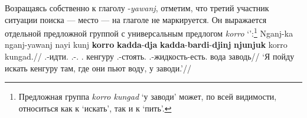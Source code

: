 
Возращаясь собственно к глаголу -\textit{yawanj}, отметим, что третий участник ситуации поиска --- место --- на глаголе не маркируется. Он выражается отдельной предложной группой с универсальным предлогом \textit{korro} `\korro':\footnote{Предложная группа \textit{korro kungad} `у заводи' может, по всей видимости, относиться как к `искать', так и к `пить'.}
\begingl
\gla Nganj-ka nganj-yawanj nayi kunj \textbf{korro} \textbf{kadda}-\textbf{dja} \textbf{kadda}-\textbf{bardi}-\textbf{djinj} \textbf{njunjuk} korro kungad.//
\glb \Fsg.\Fut-идти.\Np{} \Fsg.\Fut-\yaw.\Np{} \Nm.\Cli{} кенгуру \korro{} \Tpl.\Real-стоять.\Np{} \Tpl.\Real-жидкость-есть.\Np{} вода \korro{} заводь//
\glft `Я пойду искать кенгуру там, где они пьют воду, у заводи.'//%
\endgl\xe

